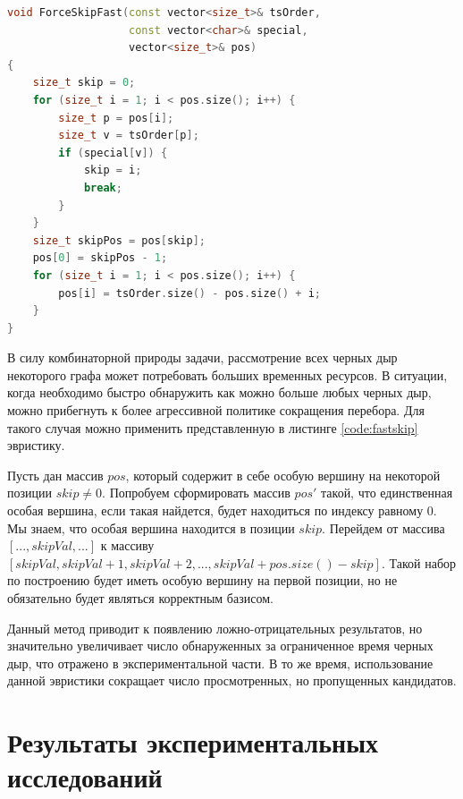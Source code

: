 \documentclass[12pt,a4paper,oneside,openany]{article}
\theoremstyle{definition}
\theoremstyle{lemma}
\theoremstyle{remark}
\begin{document}
\begin{lstlisting}[language=C++, caption=Пропуск большого числа кандидатов. Допускаются ложно-отрицательные результаты., label=code:fastskip]
void ForceSkipFast(const vector<size_t>& tsOrder,
                   const vector<char>& special,
                   vector<size_t>& pos)
{
    size_t skip = 0;
    for (size_t i = 1; i < pos.size(); i++) {
        size_t p = pos[i];
        size_t v = tsOrder[p];
        if (special[v]) {
            skip = i;
            break;
        }
    }
    size_t skipPos = pos[skip];
    pos[0] = skipPos - 1;
    for (size_t i = 1; i < pos.size(); i++) {
        pos[i] = tsOrder.size() - pos.size() + i;
    }
}
\end{lstlisting}


В силу комбинаторной природы задачи, рассмотрение всех черных дыр некоторого графа может
потребовать больших временных ресурсов. В ситуации, когда необходимо быстро обнаружить
как можно больше любых черных дыр, можно прибегнуть к более агрессивной политике сокращения
перебора. Для такого случая можно применить представленную в листинге \ref{code:fastskip}
эвристику.

Пусть дан массив $pos$, который содержит в себе особую вершину на некоторой позиции $skip \neq 0$.
Попробуем сформировать массив $pos'$ такой, что единственная особая вершина, если такая найдется,
будет находиться по индексу равному $0$.
Мы знаем, что особая вершина  находится в позиции $skip$. Перейдем от массива $[..., skipVal, ...]$ к массиву
$[skipVal, skipVal + 1, skipVal + 2, ... , skipVal + pos.size() - skip]$.
Такой набор по построению будет иметь особую вершину на первой позиции, но не обязательно будет являться корректным базисом.

Данный метод приводит к появлению ложно-отрицательных результатов, но значительно увеличивает число обнаруженных за
ограниченное время черных дыр, что отражено в экспериментальной части. В то же время, использование данной эвристики
сокращает число просмотренных, но пропущенных кандидатов.

\cleardoublepage
\section{Результаты экспериментальных исследований}\label{sec:experimentalresults}
\end{document}
